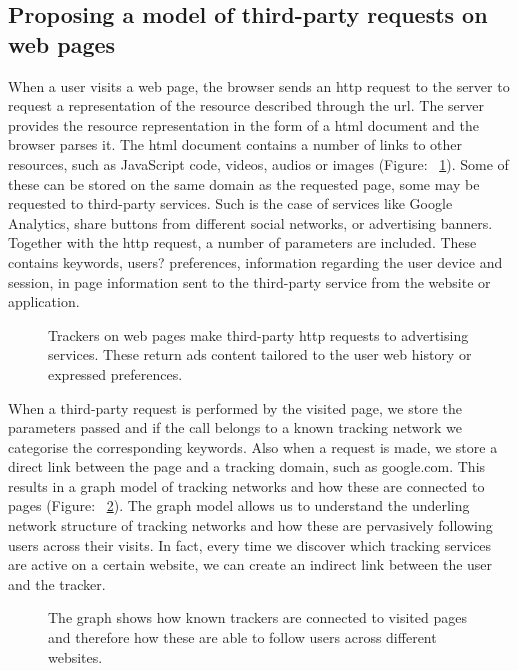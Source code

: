 \subsection{Proposing a model of third-party requests on web pages}

When a user visits a web page, the browser sends an http request to the server to request a representation of the resource described through the url. The server provides the resource representation in the form of a html document and the browser parses it. The html document contains a number of links to other resources, such as JavaScript code, videos, audios or images (Figure: ~\ref{third-party}). Some of these can be stored on the same domain as the requested page, some may be requested to third-party services. Such is the case of services like Google Analytics, share buttons from different social networks, or advertising banners. Together with the http request, a number of parameters are included. These contains keywords, users? preferences, information regarding the user device and session, in page information sent to the third-party service from the website or application.

\setcounter{figure}{1}
\begin{figure}
\centerline{\epsfxsize=350pt}
\caption{Trackers on web pages make third-party http requests to advertising services. These return ads content tailored to the user web history or expressed preferences.}
\label{third-party}
\end{figure}

When a third-party request is performed by the visited page, we store the parameters passed and if the call belongs to a known tracking network we categorise the corresponding keywords. Also when a request is made, we store a direct link between the page and a tracking domain, such as google.com. This results in a graph model of tracking networks and how these are connected to pages (Figure: ~\ref{graph-map}). The graph model allows us to understand the underling network structure of tracking networks and how these are pervasively following users across their visits. In fact, every time we discover which tracking services are active on a certain website, we can create an indirect link between the user and the tracker.

\setcounter{figure}{2}
\begin{figure}
\centerline{\epsfxsize=350pt}
\caption{The graph shows how known trackers are connected to visited pages and therefore how these are able to follow users across different websites.}
\label{graph-map}
\end{figure}

